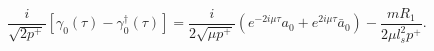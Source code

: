 \begin{equation}
\frac{i}{\sqrt{2 p^+}} \left[ \gamma_0 (\tau) - {\gamma_{0}^\dagger}(\tau) \right]
 = \frac{i}{2 \sqrt{\mu p^+}}  \left( e^{-2 i \mu \tau} a_0 +  e^{2 i \mu \tau} \bar{a}_0  \right)
 - \frac{m R_1}{2 \mu l_s^2 p^+}.
\end{equation}

